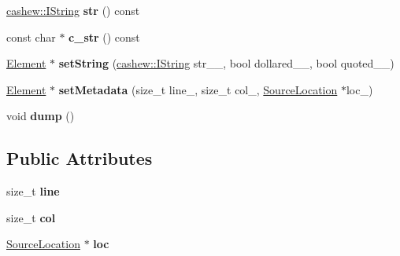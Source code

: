\begin{DoxyCompactItemize}
\item 
\mbox{\label{classwasm_1_1_element_a229800c4b5873ed3312904f3c651be1c}} 
\mbox{\hyperlink{structcashew_1_1_i_string}{cashew\+::\+I\+String}} {\bfseries str} () const
\item 
\mbox{\label{classwasm_1_1_element_a5d058cd2c435b49324c49591ce4ad93b}} 
const char $\ast$ {\bfseries c\+\_\+str} () const
\item 
\mbox{\label{classwasm_1_1_element_a95c47f6e34834f2072298949378eebab}} 
\mbox{\hyperlink{classwasm_1_1_element}{Element}} $\ast$ {\bfseries set\+String} (\mbox{\hyperlink{structcashew_1_1_i_string}{cashew\+::\+I\+String}} str\+\_\+\+\_\+, bool dollared\+\_\+\+\_\+, bool quoted\+\_\+\+\_\+)
\item 
\mbox{\label{classwasm_1_1_element_a917f9baddc2a766bc36199116c1b2db8}} 
\mbox{\hyperlink{classwasm_1_1_element}{Element}} $\ast$ {\bfseries set\+Metadata} (size\+\_\+t line\+\_\+, size\+\_\+t col\+\_\+, \mbox{\hyperlink{classwasm_1_1_source_location}{Source\+Location}} $\ast$loc\+\_\+)
\item 
\mbox{\label{classwasm_1_1_element_a75f0b0971659702d41ed4e571cf97828}} 
void {\bfseries dump} ()
\end{DoxyCompactItemize}
\subsection*{Public Attributes}
\begin{DoxyCompactItemize}
\item 
\mbox{\label{classwasm_1_1_element_ab61a2f975c42ad174d5d913a3aa42337}} 
size\+\_\+t {\bfseries line}
\item 
\mbox{\label{classwasm_1_1_element_af2b54209b93b2b641a6f298c983cdf45}} 
size\+\_\+t {\bfseries col}
\item 
\mbox{\label{classwasm_1_1_element_aa162fabe1029d735166b8bc844f32e3e}} 
\mbox{\hyperlink{classwasm_1_1_source_location}{Source\+Location}} $\ast$ {\bfseries loc}
\end{DoxyCompactItemize}
